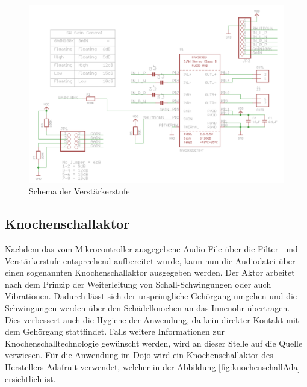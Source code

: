 \begin{figure}[H]
	\begin{center}
		\includegraphics[width=120mm]{data/Schema_Verstaerkerstufe.png}
		\caption[Verstärkerstufe \cite{Verstaerker_Schema}]{Schema der Verstärkerstufe} %
		\label{fig:verstaerkerstufe}
	\end{center}
\end{figure}

\subsection{Knochenschallaktor} \label{sec:knochenschallaktor}
Nachdem das vom Mikrocontroller ausgegebene Audio-File über die Filter- und Verstärkerstufe entsprechend aufbereitet wurde, kann nun die Audiodatei über einen sogenannten Knochenschallaktor ausgegeben werden. Der Aktor arbeitet nach dem Prinzip der Weiterleitung von Schall-Schwingungen oder auch Vibrationen. Dadurch lässt sich der ursprüngliche Gehörgang umgehen und die Schwingungen werden über den Schädelknochen an das Innenohr übertragen. Dies verbessert auch die Hygiene der Anwendung, da kein direkter Kontakt mit dem Gehörgang stattfindet\cite{Knochenschall}. Falls weitere Informationen zur Knochenschalltechnologie gewünscht werden, wird an dieser Stelle auf die Quelle \cite{Knochenschall_HDM_Stuttgart} verwiesen. Für die Anwendung im Dōjō wird ein Knochenschallaktor des Herstellers Adafruit verwendet, welcher in der Abbildung \ref{fig:knochenschallAda} ersichtlich ist.

